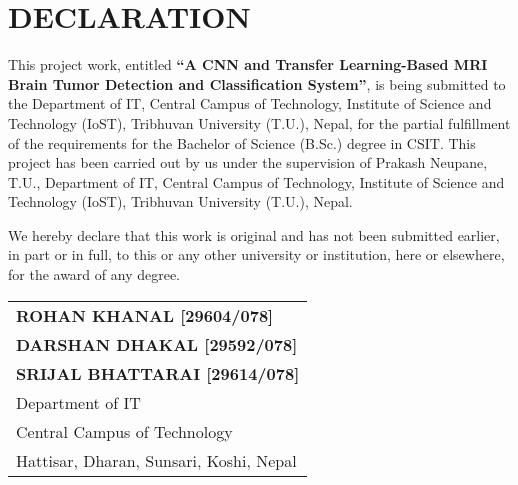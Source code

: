 \section*{\centering \Large \textbf{DECLARATION}}

\sloppy
This project work, entitled \textbf{``A CNN and Transfer Learning-Based MRI Brain Tumor Detection and Classification System''}, is being submitted to the Department of IT, Central Campus of Technology, Institute of Science and Technology (IoST), Tribhuvan University (T.U.), Nepal, for the partial fulfillment of the requirements for the Bachelor of Science (B.Sc.) degree in CSIT. This project has been carried out by us under the supervision of Prakash Neupane, T.U., Department of IT, Central Campus of Technology, Institute of Science and Technology (IoST), Tribhuvan University (T.U.), Nepal.

We hereby declare that this work is original and has not been submitted earlier, in part or in full, to this or any other university or institution, here or elsewhere, for the award of any degree.

\begin{flushleft}
\begin{tabular}{@{}l@{}}
    \textbf{ROHAN KHANAL [29604/078]} \\
    \textbf{DARSHAN DHAKAL [29592/078]} \\
    \textbf{SRIJAL BHATTARAI [29614/078]} \\
    Department of IT \\
    Central Campus of Technology \\
    Hattisar, Dharan, Sunsari, Koshi, Nepal \\
\end{tabular}
\end{flushleft}

\newpage